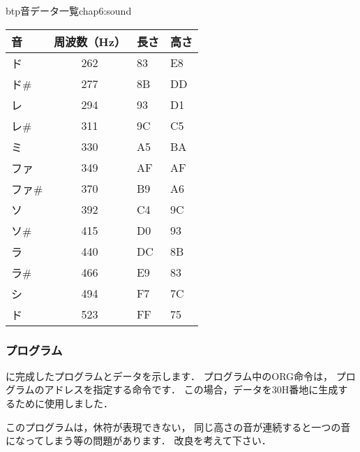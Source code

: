 \begin{mytable}{btp}{音データ一覧}{chap6:sound}
{\small\begin{tabular}{ l | c | l | l }
\hline\hline
音      & 周波数（Hz） & 長さ & 高さ \\
\hline
ド      & 262 & 83 & E8 \\
ド\#    & 277 & 8B & DD \\
レ      & 294 & 93 & D1 \\
レ\#    & 311 & 9C & C5 \\
ミ      & 330 & A5 & BA \\
ファ    & 349 & AF & AF \\
ファ\#  & 370& B9 & A6 \\
ソ      & 392 & C4 & 9C \\
ソ\#    & 415 & D0 & 93 \\
ラ      & 440 & DC & 8B \\
ラ\#    & 466 & E9 & 83 \\
シ      & 494 & F7 & 7C \\
ド      & 523 & FF & 75 \\
\end{tabular}}
\end{mytable}

\subsubsection{プログラム}

に完成したプログラムとデータを示します．
プログラム中のORG命令は，
プログラムのアドレスを指定する命令です．
この場合，データを30H番地に生成するために使用しました．

このプログラムは，休符が表現できない，
同じ高さの音が連続すると一つの音になってしまう等の問題があります．
改良を考えて下さい．

